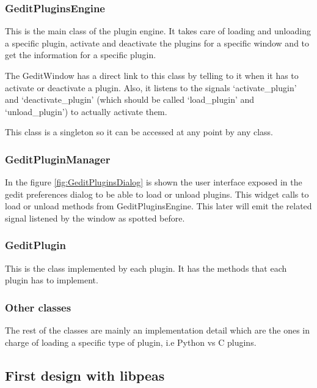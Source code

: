 \subsubsection{GeditPluginsEngine}

This is the main class of the plugin engine. It takes care of loading and unloading a specific plugin, activate and deactivate the plugins for a specific window and to get the information for a specific plugin.

The GeditWindow has a direct link to this class by telling to it when it has to activate or deactivate a plugin. Also, it listens to the signals `activate\_plugin' and `deactivate\_plugin' (which should be called `load\_plugin' and `unload\_plugin') to actually activate them.

This class is a singleton so it can be accessed at any point by any class.

\newpage
\subsubsection{GeditPluginManager}


In the figure \ref{fig:GeditPluginsDialog} is shown the user interface exposed in the gedit preferences dialog to be able to load or unload plugins. This widget calls to load or unload methods from GeditPluginsEngine. This later will emit the related signal listened by the window as spotted before.

\subsubsection{GeditPlugin}

This is the class implemented by each plugin. It has the methods that each plugin has to implement.

\subsubsection{Other classes}

The rest of the classes are mainly an implementation detail which are the ones in charge of loading a specific type of plugin, i.e Python vs C plugins.

\newpage
\subsection{First design with libpeas}


